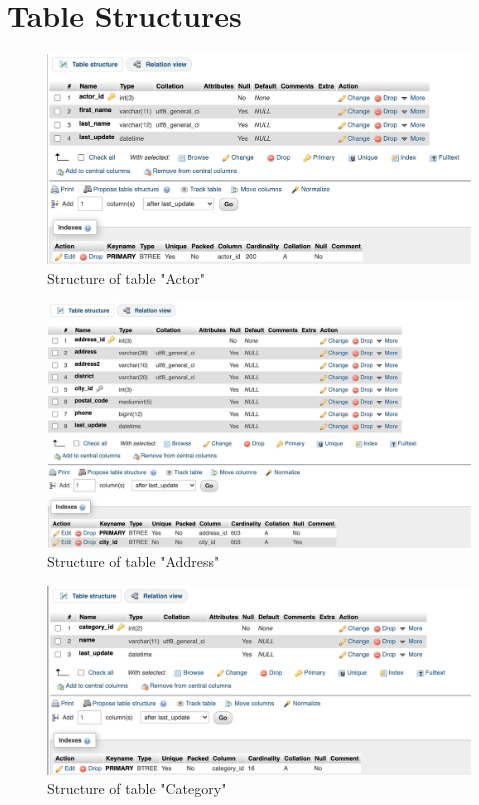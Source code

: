 \documentclass{article}
\begin{document}
\section{Table Structures}
	\begin{figure}[H]
		\includegraphics[width=\textwidth]{table_actor_struct}
		\caption{Structure of table "Actor"}	
	\end{figure}
	\begin{figure}[H]
		\includegraphics[width=\textwidth]{table_address_struct}
		\caption{Structure of table "Address"}	
	\end{figure}
	\begin{figure}[H]
		\includegraphics[width=\textwidth]{table_category_struct}
		\caption{Structure of table "Category"}	
	\end{figure}
\end{document}
